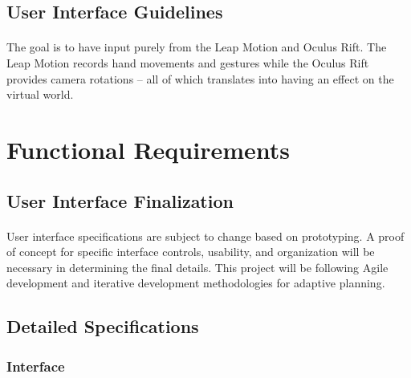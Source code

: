 \subsection{User Interface Guidelines}

\paragraph{} The goal is to have input purely from the Leap Motion and Oculus Rift. The Leap Motion records hand movements and gestures while the Oculus Rift provides camera rotations – all of which translates into having an effect on the virtual world.

\section{Functional Requirements}

\subsection{User Interface Finalization}

\paragraph{} User interface specifications are subject to change based on prototyping. A proof of concept for specific interface controls, usability, and organization will be necessary in determining the final details. This project will be following Agile development and iterative development methodologies for adaptive planning.

\subsection{Detailed Specifications}

\subsubsection{Interface}

